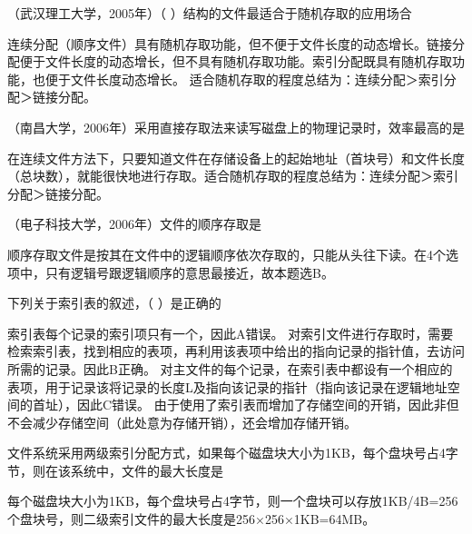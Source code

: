 \question （武汉理工大学，2005年）（ ）结构的文件最适合于随机存取的应用场合
\par{}
\begin{solution}连续分配（顺序文件）具有随机存取功能，但不便于文件长度的动态增长。链接分配便于文件长度的动态增长，但不具有随机存取功能。索引分配既具有随机存取功能，也便于文件长度动态增长。
适合随机存取的程度总结为：连续分配＞索引分配＞链接分配。
\end{solution}
\question （南昌大学，2006年）采用直接存取法来读写磁盘上的物理记录时，效率最高的是
\par{}
\begin{solution}在连续文件方法下，只要知道文件在存储设备上的起始地址（首块号）和文件长度（总块数），就能很快地进行存取。适合随机存取的程度总结为：连续分配＞索引分配＞链接分配。
\end{solution}
\question （电子科技大学，2006年）文件的顺序存取是
\par{}
\begin{solution}顺序存取文件是按其在文件中的逻辑顺序依次存取的，只能从头往下读。在4个选项中，只有逻辑号跟逻辑顺序的意思最接近，故本题选B。
\end{solution}
\question 下列关于索引表的叙述，（ ）是正确的
\par{}
\begin{solution}索引表每个记录的索引项只有一个，因此A错误。
对索引文件进行存取时，需要检索索引表，找到相应的表项，再利用该表项中给出的指向记录的指针值，去访问所需的记录。因此B正确。
对主文件的每个记录，在索引表中都设有一个相应的表项，用于记录该将记录的长度L及指向该记录的指针（指向该记录在逻辑地址空间的首址），因此C错误。
由于使用了索引表而增加了存储空间的开销，因此非但不会减少存储空间（此处意为存储开销），还会增加存储开销。
\end{solution}
\question 文件系统采用两级索引分配方式，如果每个磁盘块大小为1KB，每个盘块号占4字节，则在该系统中，文件的最大长度是
\par{}
\begin{solution}每个磁盘块大小为1KB，每个盘块号占4字节，则一个盘块可以存放1KB/4B=256个盘块号，则二级索引文件的最大长度是256×256×1KB=64MB。
\end{solution}
